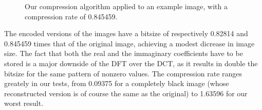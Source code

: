 \begin{figure}[ht]
    \centering
    \caption{Our compression algorithm applied to an example image, with a compression rate of 0.845459.}
    \label{fig:compression_cat}
\end{figure}

The encoded versions of the images have a bitsize of respectively 0.82814 and 0.845459 times that of the original image, achieving a modest dicrease in image size. The fact that both the real and the immaginary coefficients have to be stored is a major downside of the DFT over the DCT, as it results in double the bitsize for the same pattern of nonzero values. The compression rate ranges greately in our tests, from 0.09375 for a completely black image (whose reconstructed version is of course the same as the original) to 1.63596 for our worst result.